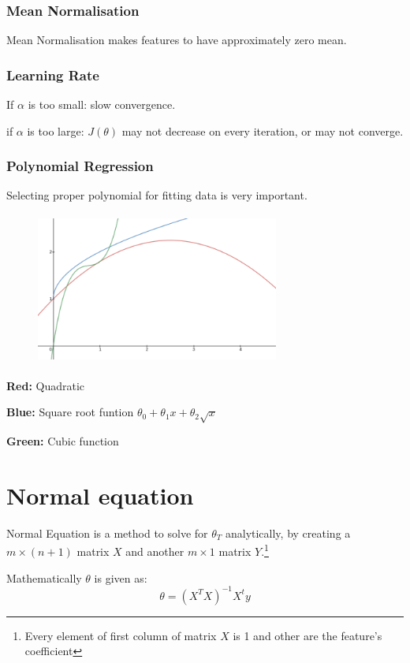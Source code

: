 \documentclass[12pt]{report}
\begin{document}
  \subsubsection{Mean Normalisation}
    Mean Normalisation makes features to have approximately zero mean.

  \subsubsection{Learning Rate}
    If $\alpha$ is too small: slow convergence.

    if $\alpha$ is too large: $J(\theta)$ may not decrease on every iteration, or may not converge.

  \subsubsection{Polynomial Regression}
    Selecting proper polynomial for fitting data is very important.

    \begin{figure}[h]
    	\includegraphics[width=8cm, height=5cm]{polyreg.png}
    \end{figure}

    \textbf{Red:} Quadratic

    \textbf {Blue:} Square root funtion $ \theta_0+\theta_1x+\theta_2\sqrt{x} $

    \textbf {Green:} Cubic function

\section{Normal equation}
  Normal Equation is a method to solve for $\theta_T$ analytically, by creating a $m\times(n+1)$ matrix $X$ and another $m\times1$ matrix $Y$.\footnote[2]{Every element of first column of matrix $X$ is 1 and other are the feature's coefficient}

  Mathematically $\theta$ is given as:
  \begin{equation} \label {eq: theta}
  	\theta = (X^TX)^{-1}X^ty
  \end{equation}
\end{document}
